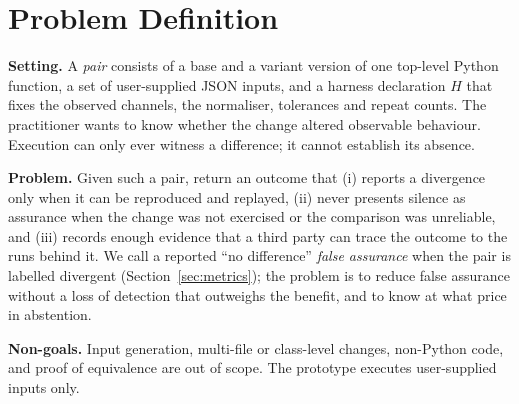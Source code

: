 \section{Problem Definition}\label{sec:problem}
\textbf{Setting.} A \emph{pair} consists of a base and a variant version of one top-level Python function, a set of user-supplied JSON inputs, and a harness declaration $H$ that fixes the observed channels, the normaliser, tolerances and repeat counts. The practitioner wants to know whether the change altered observable behaviour. Execution can only ever witness a difference; it cannot establish its absence.

\textbf{Problem.} Given such a pair, return an outcome that (i) reports a divergence only when it can be reproduced and replayed, (ii) never presents silence as assurance when the change was not exercised or the comparison was unreliable, and (iii) records enough evidence that a third party can trace the outcome to the runs behind it. We call a reported ``no difference'' \emph{false assurance} when the pair is labelled divergent (Section~\ref{sec:metrics}); the problem is to reduce false assurance without a loss of detection that outweighs the benefit, and to know at what price in abstention.

\textbf{Non-goals.} Input generation, multi-file or class-level changes, non-Python code, and proof of equivalence are out of scope. The prototype executes user-supplied inputs only.
